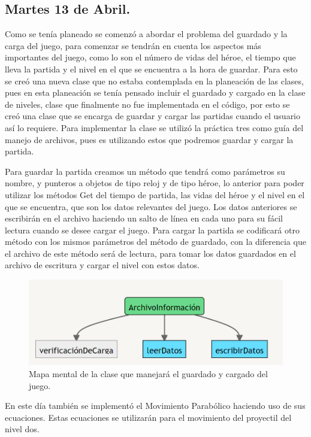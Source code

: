 \documentclass{article}
\begin{document}
\subsection{Martes 13 de Abril.}
Como se tenía planeado se comenzó a abordar el problema del guardado y la carga del juego, para comenzar se tendrán en cuenta los aspectos más importantes del juego, como lo son el número de vidas del héroe, el tiempo que lleva la partida y el nivel en el que se encuentra a la hora de guardar. Para esto se creó una nueva clase que no estaba contemplada en la planeación de las clases, pues en esta planeación se tenía pensado incluir el guardado y cargado en la clase de niveles, clase que finalmente no fue implementada en el código, por esto se creó una clase que se encarga de guardar y cargar las partidas cuando el usuario así lo requiere.
Para implementar la clase se utilizó la práctica tres como guía del manejo de archivos, pues es utilizando estos que podremos guardar y cargar la partida.

Para guardar la partida creamos un método que tendrá como parámetros su nombre, y punteros a objetos de tipo reloj y de tipo héroe, lo anterior para poder utilizar los métodos Get del tiempo de partida, las vidas del héroe y el nivel en el que se encuentra, que son los datos relevantes del juego. Los datos anteriores se escribirán en el archivo haciendo un salto de línea en cada uno para su fácil lectura cuando se desee cargar el juego. Para cargar la partida se codificará otro método con los mismos parámetros del método de guardado, con la diferencia que el archivo de este método será de lectura, para tomar los datos guardados en el archivo de escritura y cargar el nivel con estos datos.

\newpage
\begin{figure}[h]
\includegraphics[scale=0.5]{Images/archivoinfo.png}
\centering
\caption{Mapa mental de la clase que manejará el guardado y cargado del juego.}
\label{fig:claseArchivo}
\end{figure}

En este día también se implementó el Movimiento Parabólico haciendo uso de sus ecuaciones. Estas ecuaciones se utilizarán para el movimiento del proyectil del nivel dos.
\end{document}
